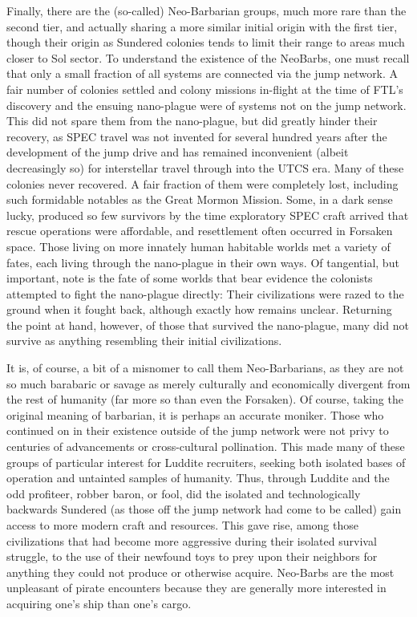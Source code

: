 Finally, there are the (so-called) Neo-Barbarian groups, much more
rare than the second tier, and actually sharing a more similar initial
origin with the first tier, though their origin as Sundered colonies
tends to limit their range to areas much closer to Sol sector. To
understand the existence of the NeoBarbs, one must recall that only a
small fraction of all systems are connected via the jump network. A
fair number of colonies settled and colony missions in-flight at the
time of FTL's discovery and the ensuing nano-plague were of systems
not on the jump network. This did not spare them from the nano-plague,
but did greatly hinder their recovery, as SPEC travel was not invented
for several hundred years after the development of the jump drive and
has remained inconvenient (albeit decreasingly so) for interstellar
travel through into the UTCS era.  Many of these colonies never
recovered. A fair fraction of them were completely lost, including
such formidable notables as the Great Mormon Mission. Some, in a dark
sense lucky, produced so few survivors by the time exploratory SPEC
craft arrived that rescue operations were affordable, and resettlement
often occurred in Forsaken space. Those living on more innately human
habitable worlds met a variety of fates, each living through the
nano-plague in their own ways. Of tangential, but important, note is
the fate of some worlds that bear evidence the colonists attempted to
fight the nano-plague directly: Their civilizations were razed to the
ground when it fought back, although exactly how remains
unclear. Returning the point at hand, however, of those that survived
the nano-plague, many did not survive as anything resembling their
initial civilizations.

It is, of course, a bit of a misnomer to call them Neo-Barbarians, as
they are not so much barabaric or savage as merely culturally and
economically divergent from the rest of humanity (far more so than
even the Forsaken). Of course, taking the original meaning of
barbarian, it is perhaps an accurate moniker. Those who continued on
in their existence outside of the jump network were not privy to
centuries of advancements or cross-cultural pollination. This made
many of these groups of particular interest for Luddite recruiters,
seeking both isolated bases of operation and untainted samples of
humanity. Thus, through Luddite and the odd profiteer, robber baron,
or fool, did the isolated and technologically backwards Sundered (as
those off the jump network had come to be called) gain access to more
modern craft and resources. This gave rise, among those civilizations
that had become more aggressive during their isolated survival
struggle, to the use of their newfound toys to prey upon their
neighbors for anything they could not produce or otherwise
acquire. Neo-Barbs are the most unpleasant of pirate encounters
because they are generally more interested in acquiring one's ship
than one's cargo.

